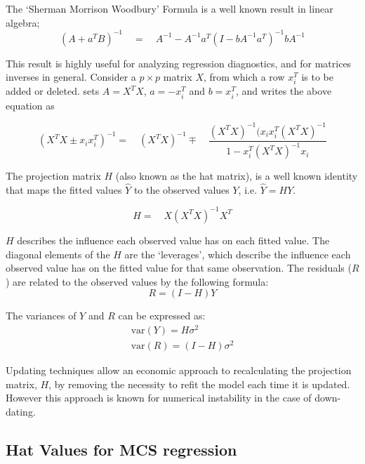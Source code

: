 The `Sherman Morrison Woodbury' Formula is a well known result in
linear algebra;
\begin{equation}
(A+a^{T}B)^{-1} \quad = \quad A^{-1}-
A^{-1}a^{T}(I-bA^{-1}a^{T})^{-1}bA^{-1}
\end{equation}

This result is highly useful for analyzing regression diagnostics,
and for matrices inverses in general. Consider a $p \times p$
matrix $X$, from which a row $x_{i}^{T}$ is to be added or
deleted. \citet{CookWeisberg} sets $A = X^{T}X$, $a=-x_{i}^{T}$
and $b=x_{i}^{T}$, and writes the above equation as

\begin{equation}
(X^{T}X \pm x_{i}x_{i}^{T})^{-1} = \quad(X^{T}X )^{-1} \mp \quad
\frac{(X^{T}X)^{-1}(x_{i}x_{i}^{T}(X^{T}X)^{-1}}{1-x_{i}^{T}(X^{T}X)^{-1}x_{i}}
\end{equation}

The projection matrix $H$ (also known as the hat matrix), is a
well known identity that maps the fitted values $\hat{Y}$ to the
observed values $Y$, i.e. $\hat{Y} = HY$.

\begin{equation}
H =\quad X(X^{T}X)^{-1}X^{T}
\end{equation}

$H$ describes the influence each observed value has on each fitted value. The diagonal elements of the $H$ are the `leverages', which describe the influence each observed value has on the fitted value for that same observation. The residuals ($R$) are related to the observed values by the following formula:
\begin{equation}
R = (I-H)Y
\end{equation}

The variances of $Y$ and $R$ can be expressed as:
\begin{eqnarray}
\mbox{var}(Y) = H\sigma^{2} \nonumber\\
\mbox{var}(R) = (I-H)\sigma^{2}
\end{eqnarray}

Updating techniques allow an economic approach to recalculating the projection matrix, $H$, by removing the necessity to refit the model each time it is updated. However this approach is known for
numerical instability in the case of down-dating.



\subsection{Hat Values for MCS regression}


